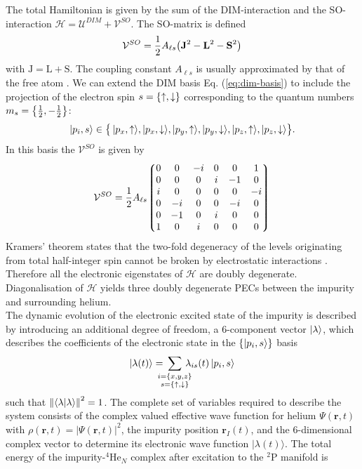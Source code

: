 \documentclass[12pt,a4paper,twosides]{book}
\renewcommand{\vec}[1]{\bm{\mathrm{#1}}}
\begin{document}
			The total Hamiltonian is given by the sum of the DIM-interaction and the SO-interaction $\mathcal{H} = \mathcal{U}^{DIM}+\mathcal{V}^{SO}$. The SO-matrix is defined
			\begin{align}
				\mathcal{V}^{SO}=\frac{1}{2}A_{\ell s}\qty(\vec{J}^2-\vec{L}^2-\vec{S}^2)
			\end{align}
			with $\vec{J}=\vec{L}+\vec{S}$. The coupling constant $A_{\ell s}$ is usually approximated by that of the free atom \cite{Jak97}. We can extend the DIM basis Eq. (\ref{eq:dim-basis}) to include the projection of the electron spin $s=\qty{\uparrow,\downarrow}$ corresponding to the quantum numbers $m_s=\qty{\frac{1}{2},-\frac{1}{2}}$:
			\begin{align}
				\ket{p_i,s}\in\qty\big{\,\ket{p_x,\uparrow}\!,\ket{p_x,\downarrow}\!,\ket{p_y,\uparrow}\!,\ket{p_y,\downarrow}\!,\ket{p_z,\uparrow}\!,\ket{p_z,\downarrow}}.
			\end{align}
			In this basis the $\mathcal{V}^{SO}$ is given by
			\begin{align}
				\mathcal{V}^{SO} = \frac{1}{2}A_{\ell s}\mqty*(0&0&-i&0&0&1\\0&0&0&i&-1&0\\i&0&0&0&0&-i\\0&-i&0&0&-i&0\\0&-1&0&i&0&0\\1&0&i&0&0&0)
			\end{align}
			Kramers' theorem states that the two-fold degeneracy of the levels originating from total half-integer spin cannot be broken by electrostatic interactions \cite{Nak01}. Therefore all the electronic eigenstates of $\mathcal{H}$ are doubly degenerate. Diagonalisation of $\mathcal{H}$ yields three doubly degenerate PECs between the impurity and surrounding helium.\\
			
			The dynamic evolution of the electronic excited state of the impurity is described by introducing an additional degree of freedom, a 6-component vector $\ket\lambda$, which describes the coefficients of the electronic state in the $\qty{\ket{p_i,s}}$ basis
			\begin{align}
				\ket{\lambda(t)} = \!\!\!\!\!\sum_{\substack{i=\{x,y,z\}\\s=\{\uparrow,\downarrow\}}}\!\!\!\!\! \lambda_{is}(t) \ket{p_i,s}
			\end{align}
			such that $\norm{\ip{\lambda}}^2=1$. The complete set of variables required to describe the
			system consists of the complex valued effective wave function for helium $\Psi(\mathbf{r}, t)$ with
			$\rho(\mathbf{r}, t) = |\Psi(\mathbf{r}, t)|^2$, the impurity position $\mathbf{r}_I(t)$, and the 6-dimensional complex vector to determine 
			its electronic wave function $|\lambda(t)\rangle$. The total energy of the impurity-$^4$He$_N$ complex after excitation to the $^2$P manifold is
\end{document}
